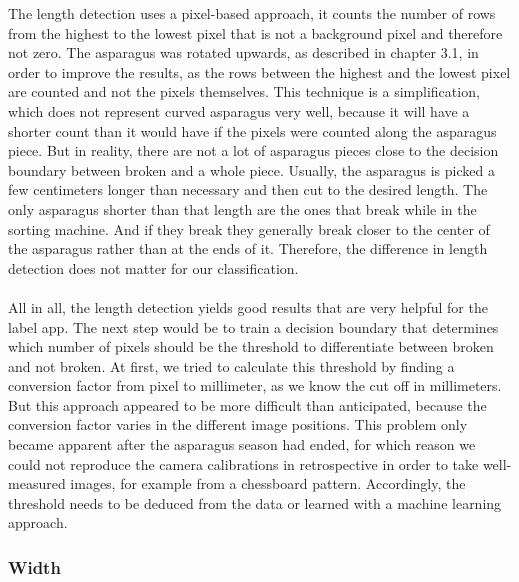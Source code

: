 The length detection uses a pixel-based approach, it counts the number of rows from the highest to the lowest pixel that is not a background pixel and therefore not zero. The asparagus was rotated upwards, as described in chapter 3.1, in order to improve the results, as the rows between the highest and the lowest pixel are counted and not the pixels themselves. This technique is a simplification, which does not represent curved asparagus very well, because it will have a shorter count than it would have if the pixels were counted along the asparagus piece. But in reality, there are not a lot of asparagus pieces close to the decision boundary between broken and a whole piece. Usually, the asparagus is picked a few centimeters longer than necessary and then cut to the desired length. The only asparagus shorter than that length are the ones that break while in the sorting machine. And if they break they generally break closer to the center of the asparagus rather than at the ends of it. Therefore, the difference in length detection does not matter for our classification. \\
\\
All in all, the length detection yields good results that are very helpful for the label app. The next step would be to train a decision boundary that determines which number of pixels should be the threshold to differentiate between broken and not broken. At first, we tried to calculate this threshold by finding a conversion factor from pixel to millimeter, as we know the cut off in millimeters. But this approach appeared to be more difficult than anticipated, because the conversion factor varies in the different image positions. This problem only became apparent after the asparagus season had ended, for which reason we could not reproduce the camera calibrations in retrospective in order to take well-measured images, for example from a chessboard pattern. Accordingly, the threshold needs to be deduced from the data or learned with a machine learning approach.

\subsubsection{Width}
\label{subsec:Width}

